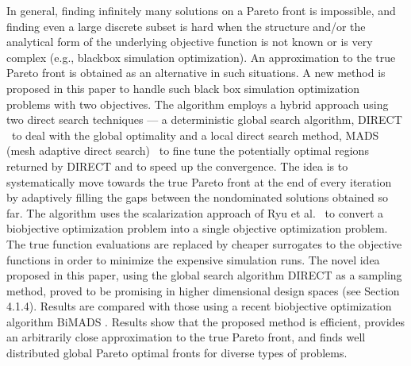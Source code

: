 In general, finding infinitely many solutions on a Pareto front is impossible, 
and finding even a large discrete subset is hard when the structure and/or 
the analytical form of the underlying objective function is not known or 
is very complex (e.g., blackbox simulation optimization). An approximation 
to the true Pareto front is obtained as an alternative in such situations. 
A new method is proposed in this paper to handle such black box simulation 
optimization problems with two objectives. The algorithm employs a hybrid 
approach using two direct search techniques --- a deterministic global search 
algorithm, DIRECT \JPS\ to deal with the global optimality and a local direct 
search method, MADS (mesh adaptive direct search) \AD\ to fine tune the 
potentially optimal regions returned by DIRECT and to speed up the convergence. 
The idea is to systematically move towards the true Pareto front at the end of 
every iteration by adaptively filling the gaps between the nondominated 
solutions obtained so far. The algorithm uses the scalarization approach of Ryu 
et al. \RKW\ to convert a biobjective optimization problem into a single 
objective optimization problem. The true function evaluations are replaced by 
cheaper surrogates to the objective functions in order to minimize the 
expensive simulation runs. The novel idea proposed in this paper, using the 
global search algorithm DIRECT as a sampling method, proved to be promising in 
higher dimensional design spaces (see Section 4.1.4). Results are compared 
with those using a recent biobjective optimization algorithm BiMADS \ASZI. 
Results show that the proposed method is efficient, provides an 
arbitrarily close approximation to the true Pareto front, and finds well 
distributed global Pareto optimal fronts for diverse types of problems. 

